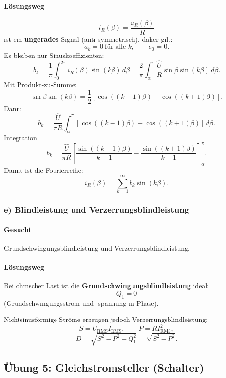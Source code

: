\paragraph{Lösungsweg}
\[
i_R(\beta)=\frac{u_R(\beta)}{R}
\]
ist ein \textbf{ungerades} Signal (anti-symmetrisch), daher gilt:
\[
\boxed{a_k=0\ \text{für alle }k,\qquad a_0=0.}
\]
Es bleiben nur Sinuskoeffizienten:
\[
b_k=\frac{1}{\pi}\int_0^{2\pi} i_R(\beta)\sin(k\beta)\,d\beta
=
\frac{2}{\pi}\int_{\alpha}^{\pi} \frac{\hat U}{R}\sin\beta\sin(k\beta)\,d\beta.
\]
Mit Produkt-zu-Summe:
\[
\sin\beta\sin(k\beta)=\frac{1}{2}\left[\cos((k-1)\beta)-\cos((k+1)\beta)\right].
\]
Dann:
\[
b_k=\frac{\hat U}{\pi R}\int_{\alpha}^{\pi}\left[\cos((k-1)\beta)-\cos((k+1)\beta)\right]\,d\beta.
\]
Integration:
\[
\boxed{
b_k
=
\frac{\hat U}{\pi R}
\left[
\frac{\sin((k-1)\beta)}{k-1}
-
\frac{\sin((k+1)\beta)}{k+1}
\right]_{\alpha}^{\pi}
}.
\]
Damit ist die Fourierreihe:
\[
\boxed{
i_R(\beta)=\sum_{k=1}^{\infty} b_k \sin(k\beta).
}
\]


\subsubsection*{e) Blindleistung und Verzerrungsblindleistung}

\paragraph{Gesucht}
Grundschwingungsblindleistung und Verzerrungsblindleistung.

\paragraph{Lösungsweg}
Bei ohmscher Last ist die \textbf{Grundschwingungsblindleistung} ideal:
\[
\boxed{Q_1=0}
\]
(Grundschwingungsstrom und -spannung in Phase).

Nichtsinusförmige Ströme erzeugen jedoch Verzerrungsblindleistung:
\[
S = U_{\mathrm{RMS}} I_{\mathrm{RMS}},\qquad P=R I_{\mathrm{RMS}}^2,
\]
\[
\boxed{D=\sqrt{S^2-P^2-Q_1^2}=\sqrt{S^2-P^2}}.
\]



\subsection{Übung 5: Gleichstromsteller (Schalter) }

